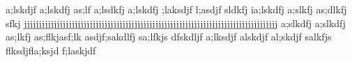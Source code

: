                                                                      a;lskdjf a;lskdfj as;lf                                                                                        a;lsdkfj a;lskdfj ;laksdjf l;asdjf sldkfj                                                                                                                           ia;lskdfj a;slkfj as;dlkfj sfkj jjjjjjjjjjjjjjjjjjjjjjjjjjjjjjjjjjjjjjjjjjjjjjjjjjjjjjjjjjjjjjjjjjjjjjjjjjjjjjjjjjjjj                                           a;slkdfj a;slkdfj as;lkfj as;flkjasf;lk asdjf;sakdlfj sa;lfkjs dfskdljf a;lksdjf  alskdjf al;skdjf salkfjs flksdjfla;ksjd f;laskjdf                                                                                                                                      
